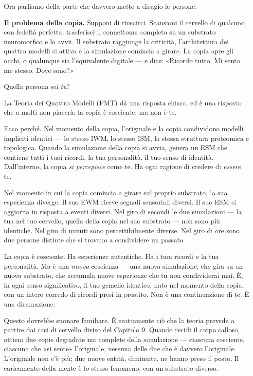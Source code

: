\documentclass[11pt, twoside, openright]{book}
\begin{document}
Ora parliamo della parte che davvero mette a disagio le persone.

\textbf{Il problema della copia.} Supponi di riuscirci. Scansioni il cervello di qualcuno con fedeltà perfetta, trasferisci il connettoma completo su un substrato neuromorfico e lo avvii. Il substrato raggiunge la criticità, l'architettura dei quattro modelli si attiva e la simulazione comincia a girare. La copia apre gli occhi, o qualunque sia l'equivalente digitale --- e dice: «Ricordo tutto. Mi sento me stesso. Dove sono?»

Quella persona sei \textit{tu}?

La Teoria dei Quattro Modelli (FMT) dà una risposta chiara, ed è una risposta che a molti non piacerà: la copia è cosciente, ma non è te.

Ecco perché. Nel momento della copia, l'originale e la copia condividono modelli impliciti identici --- lo stesso IWM, lo stesso ISM, la stessa struttura proteomica e topologica. Quando la simulazione della copia si avvia, genera un ESM che contiene tutti i tuoi ricordi, la tua personalità, il tuo senso di identità. Dall'interno, la copia \textit{si percepisce} come te. Ha ogni ragione di credere di \textit{essere} te.

Nel momento in cui la copia comincia a girare sul proprio substrato, la sua esperienza diverge. Il suo EWM riceve segnali sensoriali diversi. Il suo ESM si aggiorna in risposta a eventi diversi. Nel giro di secondi le due simulazioni --- la tua nel tuo cervello, quella della copia nel suo substrato --- non sono più identiche. Nel giro di minuti sono percettibilmente diverse. Nel giro di ore sono due persone distinte che si trovano a condividere un passato.

La copia è cosciente. Ha esperienze autentiche. Ha i tuoi ricordi e la tua personalità. Ma è una \textit{nuova} coscienza --- una nuova simulazione, che gira su un nuovo substrato, che accumula nuove esperienze che tu non condividerai mai. È, in ogni senso significativo, il tuo gemello identico, nato nel momento della copia, con un intero corredo di ricordi presi in prestito. Non è una continuazione di te. È una diramazione.

Questo dovrebbe suonare familiare. È esattamente ciò che la teoria prevede a partire dai casi di cervello diviso del Capitolo 9. Quando recidi il corpo calloso, ottieni due copie degradate ma complete della simulazione --- ciascuna cosciente, ciascuna che «si sente» l'originale, nessuna delle due che è davvero l'originale. L'originale non c'è più; due nuove entità, diminuite, ne hanno preso il posto. Il caricamento della mente è lo stesso fenomeno, con un substrato diverso.
\end{document}

